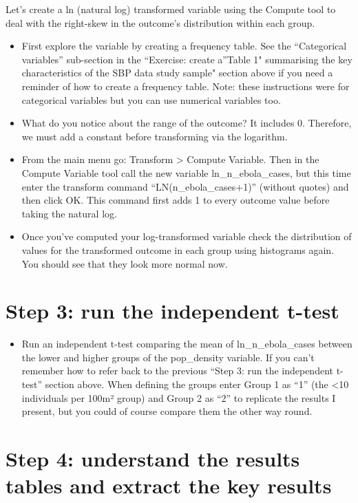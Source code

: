 \documentclass[
]{book}
\providecommand{\tightlist}{%
  \setlength{\itemsep}{0pt}\setlength{\parskip}{0pt}}
\begin{document}
Let's create a ln (natural log) transformed variable using the Compute tool to deal with the right-skew in the outcome's distribution within each group.

\begin{itemize}
\item
  First explore the variable by creating a frequency table. See the ``Categorical variables'' sub-section in the ``Exercise: create a''Table 1" summarising the key characteristics of the SBP data study sample" section above if you need a reminder of how to create a frequency table. Note: these instructions were for categorical variables but you can use numerical variables too.
\item
  What do you notice about the range of the outcome? It includes 0. Therefore, we must add a constant before transforming via the logarithm.
\item
  From the main menu go: Transform \textgreater{} Compute Variable. Then in the Compute Variable tool call the new variable ln\_n\_ebola\_cases, but this time enter the transform command ``LN(n\_ebola\_cases+1)'' (without quotes) and then click OK. This command first adds 1 to every outcome value before taking the natural log.
\item
  Once you've computed your log-transformed variable check the distribution of values for the transformed outcome in each group using histograms again. You should see that they look more normal now.
\end{itemize}

\hypertarget{step-3-run-the-independent-t-test-1}{%
\section{Step 3: run the independent t-test}\label{step-3-run-the-independent-t-test-1}}

\begin{itemize}
\tightlist
\item
  Run an independent t-test comparing the mean of ln\_n\_ebola\_cases between the lower and higher groups of the pop\_density variable. If you can't remember how to refer back to the previous ``Step 3: run the independent t-test'' section above. When defining the groups enter Group 1 as ``1'' (the \textless10 individuals per 100m² group) and Group 2 as ``2'' to replicate the results I present, but you could of course compare them the other way round.
\end{itemize}

\hypertarget{step-4-understand-the-results-tables-and-extract-the-key-results-1}{%
\section{Step 4: understand the results tables and extract the key results}\label{step-4-understand-the-results-tables-and-extract-the-key-results-1}}
\end{document}
